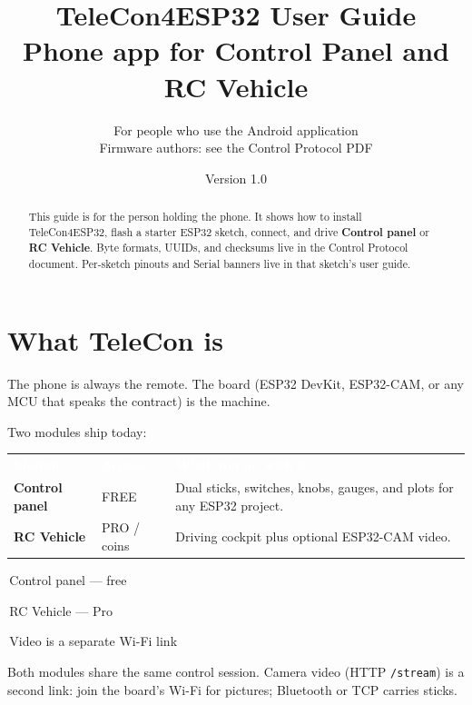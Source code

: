 \documentclass[12pt,a4paper]{article}
\title{TeleCon4ESP32 User Guide\\[0.35em]
\large Phone app for Control Panel and RC Vehicle}
\author{For people who use the Android application\\
\small Firmware authors: see the Control Protocol PDF}
\date{Version 1.0 \quad 2026}
\newcommand{\thc}[1]{\textcolor{white}{\bfseries #1}}
\newcommand{\chip}[2]{\colorbox{#1}{\strut\,\scriptsize #2\,}}
\newcommand{\ui}[1]{\textsf{\textbf{#1}}}
\begin{document}
\maketitle

\begin{abstract}
This guide is for the person holding the phone.
It shows how to install TeleCon4ESP32, flash a starter ESP32 sketch, connect,
and drive \ui{Control panel} or \ui{RC Vehicle}.
Byte formats, UUIDs, and checksums live in the Control Protocol document.
Per-sketch pinouts and Serial banners live in that sketch's user guide.
\end{abstract}

\section{What TeleCon is}
\label{sec:what}

The phone is always the remote.
The board (ESP32 DevKit, ESP32-CAM, or any MCU that speaks the contract) is
the machine.

Two modules ship today:

\begin{center}
\renewcommand{\arraystretch}{1.25}
\begin{tabular}{>{\raggedright\arraybackslash}p{3.4cm}
                >{\centering\arraybackslash}p{2.2cm}
                >{\raggedright\arraybackslash}p{6.6cm}}
\rowcolor{TblHead}
\thc{Module} & \thc{Access} & \thc{What you do with it} \\
\rowcolor{TblChan}
\ui{Control panel} & FREE & Dual sticks, switches, knobs, gauges, and plots
for any ESP32 project. \\
\rowcolor{TblSum}
\ui{RC Vehicle} & PRO / coins & Driving cockpit plus optional ESP32-CAM video. \\
\end{tabular}
\end{center}

\vspace{0.4em}
{\sffamily\scriptsize
\chip{TblChan}{Control panel --- free}
\chip{TblSum}{RC Vehicle --- Pro}
\chip{TblTelem}{Video is a separate Wi-Fi link}}

Both modules share the same control session.
Camera video (HTTP \texttt{/stream}) is a second link: join the board's Wi-Fi
for pictures; Bluetooth or TCP carries sticks.
\end{document}
